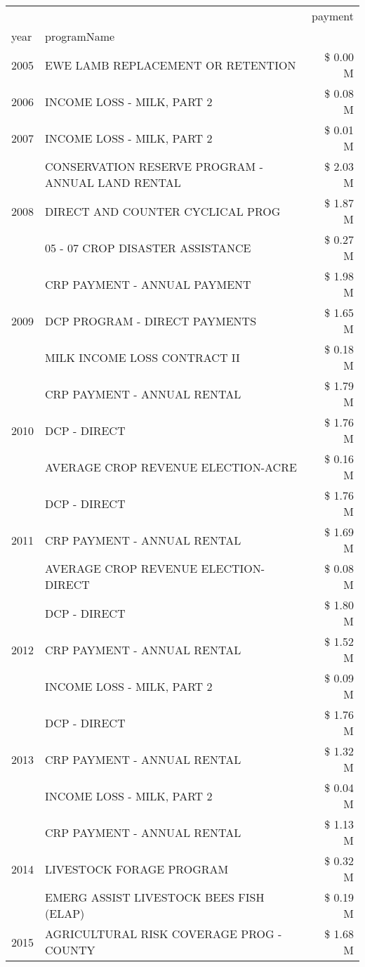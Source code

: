 \begin{tabular}{llr}
\toprule
 &  & payment \\
year & programName &  \\
\midrule
2005 & EWE LAMB REPLACEMENT OR RETENTION & \$ 0.00 M \\
\cline{1-3}
2006 & INCOME LOSS - MILK, PART 2 & \$ 0.08 M \\
\cline{1-3}
2007 & INCOME LOSS - MILK, PART 2 & \$ 0.01 M \\
\cline{1-3}
\multirow[t]{3}{*}{2008} & CONSERVATION RESERVE PROGRAM - ANNUAL LAND RENTAL & \$ 2.03 M \\
 & DIRECT AND COUNTER CYCLICAL PROG & \$ 1.87 M \\
 & 05 - 07 CROP DISASTER ASSISTANCE & \$ 0.27 M \\
\cline{1-3}
\multirow[t]{3}{*}{2009} & CRP PAYMENT - ANNUAL PAYMENT & \$ 1.98 M \\
 & DCP PROGRAM - DIRECT PAYMENTS & \$ 1.65 M \\
 & MILK INCOME LOSS CONTRACT II & \$ 0.18 M \\
\cline{1-3}
\multirow[t]{3}{*}{2010} & CRP PAYMENT - ANNUAL RENTAL & \$ 1.79 M \\
 & DCP - DIRECT & \$ 1.76 M \\
 & AVERAGE CROP REVENUE ELECTION-ACRE & \$ 0.16 M \\
\cline{1-3}
\multirow[t]{3}{*}{2011} & DCP - DIRECT & \$ 1.76 M \\
 & CRP PAYMENT - ANNUAL RENTAL & \$ 1.69 M \\
 & AVERAGE CROP REVENUE ELECTION-DIRECT & \$ 0.08 M \\
\cline{1-3}
\multirow[t]{3}{*}{2012} & DCP - DIRECT & \$ 1.80 M \\
 & CRP PAYMENT - ANNUAL RENTAL & \$ 1.52 M \\
 & INCOME LOSS - MILK, PART 2 & \$ 0.09 M \\
\cline{1-3}
\multirow[t]{3}{*}{2013} & DCP - DIRECT & \$ 1.76 M \\
 & CRP PAYMENT - ANNUAL RENTAL & \$ 1.32 M \\
 & INCOME LOSS - MILK, PART 2 & \$ 0.04 M \\
\cline{1-3}
\multirow[t]{3}{*}{2014} & CRP PAYMENT - ANNUAL RENTAL & \$ 1.13 M \\
 & LIVESTOCK FORAGE PROGRAM & \$ 0.32 M \\
 & EMERG ASSIST LIVESTOCK BEES FISH (ELAP) & \$ 0.19 M \\
\cline{1-3}
\multirow[t]{3}{*}{2015} & AGRICULTURAL RISK COVERAGE PROG - COUNTY & \$ 1.68 M \\

\end{tabular}
